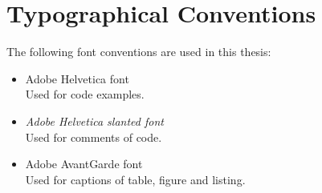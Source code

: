 \section{Typographical Conventions}
The following font conventions are used in this thesis:
\begin{itemize}
 \item {\selectfont Adobe Helvetica font}\\
 Used for code examples.
 \item {\selectfont \textsl{Adobe Helvetica slanted font}}\\
 Used for comments of code.
 \item {\selectfont Adobe AvantGarde font}\\
 Used for captions of table, figure and listing.
\end{itemize}
